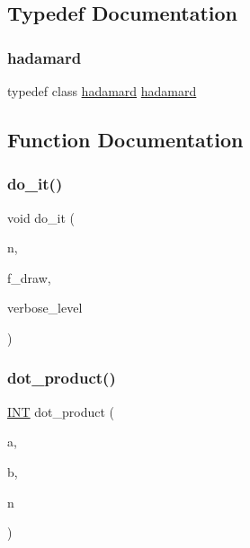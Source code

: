 \subsection{Typedef Documentation}
\mbox{\label{hadamard_8_c_a89981e30debe41ebf66bb2498fdabbfc}} 
\subsubsection{\texorpdfstring{hadamard}{hadamard}}
{\footnotesize\ttfamily typedef class \mbox{\hyperlink{classhadamard}{hadamard}} \mbox{\hyperlink{classhadamard}{hadamard}}}



\subsection{Function Documentation}
\mbox{\label{hadamard_8_c_a43e760f00f7306dff572dae5a6135e5a}} 
\subsubsection{\texorpdfstring{do\+\_\+it()}{do\_it()}}
{\footnotesize\ttfamily void do\+\_\+it (\begin{DoxyParamCaption}\item[{\mbox{\hyperlink{galois_8h_a09fddde158a3a20bd2dcadb609de11dc}{I\+NT}}}]{n,  }\item[{\mbox{\hyperlink{galois_8h_a09fddde158a3a20bd2dcadb609de11dc}{I\+NT}}}]{f\+\_\+draw,  }\item[{\mbox{\hyperlink{galois_8h_a09fddde158a3a20bd2dcadb609de11dc}{I\+NT}}}]{verbose\+\_\+level }\end{DoxyParamCaption})}

\mbox{\label{hadamard_8_c_accd41df23175cf150ef5666933d6ce8e}} 
\subsubsection{\texorpdfstring{dot\+\_\+product()}{dot\_product()}}
{\footnotesize\ttfamily \mbox{\hyperlink{galois_8h_a09fddde158a3a20bd2dcadb609de11dc}{I\+NT}} dot\+\_\+product (\begin{DoxyParamCaption}\item[{\mbox{\hyperlink{galois_8h_a09fddde158a3a20bd2dcadb609de11dc}{I\+NT}}}]{a,  }\item[{\mbox{\hyperlink{galois_8h_a09fddde158a3a20bd2dcadb609de11dc}{I\+NT}}}]{b,  }\item[{\mbox{\hyperlink{galois_8h_a09fddde158a3a20bd2dcadb609de11dc}{I\+NT}}}]{n }\end{DoxyParamCaption})}


